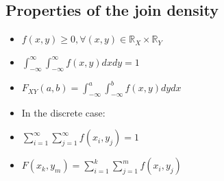 \documentclass[12pt]{article}
\begin{document}
\subsection{Properties of the join density}
\begin{itemize}
\item $ f(x,y) \ge 0, \forall (x,y) \in \mathbb{R}_{X} \times \mathbb{R}_{Y}$ 
\item $ \int_{ - \infty }^{\infty } \int_{ - \infty }^{\infty }f(x,y)dx dy  = 1 $
\item $ F_{XY}(a,b) = \int_{ - \infty }^{a}\int_{ - \infty }^{b}f(x,y)dydx   $
\item In the discrete case:
\item $ \sum\limits_{i = 1} ^\infty \sum\limits_{j = 1} ^\infty f(x_{i},y_{j}) = 1 $
\item $ F(x_{k},y_{m}) = \sum\limits_{i = 1} ^k \sum\limits_{j = 1} ^m f(x_{i},y_{j})		 $
\end{itemize}






\end{document}
